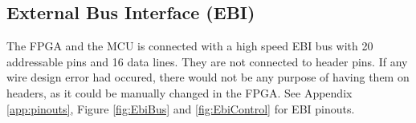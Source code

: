 \subsection{External Bus Interface (EBI)}
The FPGA and the MCU is connected with a high speed EBI bus with 20 addressable pins and 16 data lines. They are not connected to header pins. If any wire design error had occured, there would not be any purpose of having them on headers, as it could be manually changed in the FPGA.
See Appendix \ref{app:pinouts}, Figure \ref{fig:EbiBus} and \ref{fig:EbiControl} for EBI pinouts.

